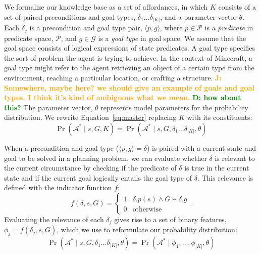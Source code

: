 \documentclass[conference]{IEEEtran}
\newcommand{\dnote}[1]{\textcolor{Green}{\textbf{D: #1}}}
\newcommand{\jnote}[1]{\textcolor{Orange}{\textbf{J: #1}}}
\begin{document}
We formalize our knowledge base as a set of affordances, in which $K$
consists of a set of paired preconditions and goal types, $\delta_1
\ldots \delta_{|K|}$, and a parameter vector $\theta$.  Each
$\delta_j$ is a precondition and goal type pair, $\langle p, g
\rangle$, where $p \in \mathcal{P}$ is a {\it predicate} in predicate space, 
$\mathcal{P}$, and $g \in \mathcal{G}$ is a {\it goal type} in goal space. 
We assume that the goal space consists of logical expressions of state predicates.
A goal type specifies the sort of problem the agent is trying to achieve. In the context of Minecraft,
a goal type might refer to the agent retrieving an object of a certain type from the environment, reaching a particular location, or crafting a structure. \jnote{Somewhere, maybe here? we should give an example of goals and goal types.
I think it's kind of ambiguous what we mean.} \dnote{how about this?}
The parameter vector, $\theta$ represents model parameters for the probability distribution.
We rewrite Equation~\ref{eq:master} replacing $K$ with its constituents:
\begin{equation}
\Pr(\mathcal{A}^* \mid s, G, K) = \Pr(\mathcal{A}^* \mid s, G, \delta_1 \ldots \delta_{|K|}, \theta)
\end{equation}

When a precondition and goal type ($\langle p , g \rangle = \delta$) is paired with a current state and goal to be solved in a planning problem, we can evaluate whether $\delta$ is relevant to the current circumstance by checking if the predicate of $\delta$ is true in the current state and if the current goal logically entails the goal type of $\delta$. This relevance is defined with the indicator function $f$:
\begin{equation}
f(\delta, s, G) = 
\begin{cases}
1& \delta.p(s) \wedge G \models \delta.g \\
0& \text{otherwise}
\end{cases}.
\label{eq:f_func_def}
\end{equation}
Evaluating the relevance of each $\delta_j$ gives rise to a set of binary features, $\phi_j = f(\delta_j, s, G)$, which we use to reformulate our probability distribution:
\begin{equation}
\Pr(\mathcal{A}^* \mid s, G, \delta_1 \ldots \delta_{|K|}, \theta) = \Pr(\mathcal{A}^* \mid \phi_1, \ldots, \phi_{|K|}, \theta)
\label{eq:feature_rep}
\end{equation}
\end{document}
